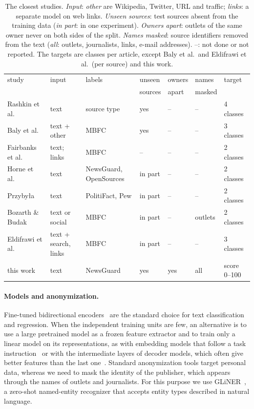 \documentclass[11pt,a4paper]{article}
\begin{document}
\begin{table}[t]
\centering\small
\caption{The closest studies. \emph{Input}: \emph{other} are Wikipedia, Twitter, URL and traffic; \emph{links}: a
separate model on web links. \emph{Unseen sources}: test sources absent from the training data (\emph{in part}: in one
experiment). \emph{Owners apart}: outlets of the same owner never on both sides of the split. \emph{Names masked}:
source identifiers removed from the text (\emph{all}: outlets, journalists, links, e-mail addresses). --: not done or
not reported. The targets are classes per article, except Baly et al.\ and Eldifrawi et al.\ (per source) and this work.}\label{tab:related}
\footnotesize\setlength{\tabcolsep}{3.5pt}
\begin{tabular}{lllllll}
\toprule
study & input & labels & unseen & owners & names & target \\
 & & & sources & apart & masked & \\
\midrule
Rashkin et al.~\cite{rashkin2017truth} & text & source type & yes & -- & -- & 4 classes \\
Baly et al.~\cite{baly2018predicting} & text + other & MBFC & yes & -- & -- & 3 classes \\
Fairbanks et al.~\cite{fairbanks2018credibility} & text; links & MBFC & -- & -- & -- & 2 classes \\
Horne et al.~\cite{horne2019robust} & text & NewsGuard, OpenSources & in part & -- & -- & 2 classes \\
Przyby{\l}a~\cite{przybyla2020capturing} & text & PolitiFact, Pew & in part & -- & -- & 2 classes \\
Bozarth \& Budak~\cite{bozarth2020toward} & text or social & MBFC & in part & -- & outlets & 2 classes \\
Eldifrawi et al.~\cite{eldifrawi2026temporal} & text + search, links & MBFC & in part & -- & -- & 3 classes \\
\midrule
this work & text & NewsGuard & yes & yes & all & score 0--100 \\
\bottomrule
\end{tabular}
\end{table}

\paragraph{Models and anonymization.} Fine-tuned bidirectional encoders~\cite{devlin2019bert,warner2024modernbert} are
the standard choice for text classification and regression. When the independent training units are few, an alternative
is to use a large pretrained model as a frozen feature extractor and to train only a linear model on its
representations, as with embedding models that follow a task instruction~\cite{zhang2025qwen3} or with the intermediate
layers of decoder models, which often give better features than the last one~\cite{skean2025layer}. Standard
anonymization tools target personal data, whereas we need to mask the identity of the publisher, which appears through
the names of outlets and journalists. For this purpose we use GLiNER~\cite{zaratiana2024gliner}, a zero-shot
named-entity recognizer that accepts entity types described in natural language.
\end{document}
